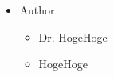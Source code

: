 

 \begin{itemize}
  \item Author
 \begin{itemize}
  \item Dr. HogeHoge
  \item HogeHoge
 \end{itemize}
\end{itemize}